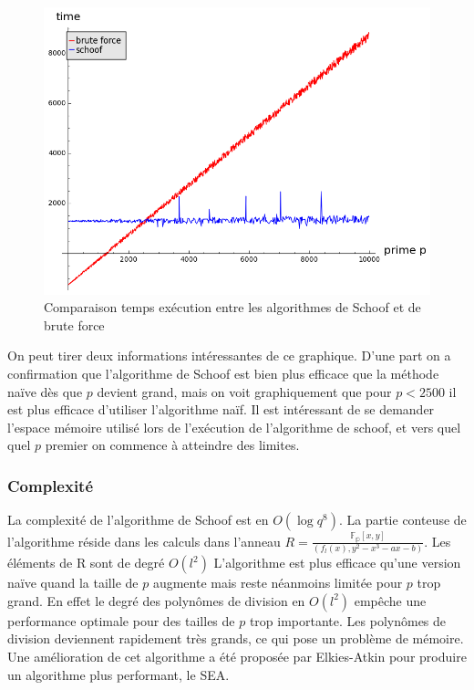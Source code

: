 \documentclass{article}
\begin{document}
\begin{figure}[h!]
\caption{Comparaison temps exécution entre les algorithmes de Schoof et de brute force}
\includegraphics[scale=0.6]{pictures/schoof_vs_bruteforce.png} 
\end{figure}
On peut tirer deux informations intéressantes de ce graphique. D'une part on a confirmation que l'algorithme de Schoof est bien plus efficace que la méthode naïve dès que $p$ devient grand, mais on voit graphiquement que pour $p<2500$ il est plus efficace d'utiliser l'algorithme naïf.
\newline
Il est intéressant de se demander l'espace mémoire utilisé lors de l’exécution de l'algorithme de schoof, et vers quel quel $p$ premier on commence à atteindre des limites.
\newpage
\subsubsection{Complexité}
La complexité de l'algorithme de Schoof est en $O(\log{q}^8)$. La partie conteuse de l'algorithme réside dans les calculs dans l'anneau $R = \frac{\mathbb{F_p}[x,y]}{(f_l(x), y^2 -x^3 -ax -b)}$. Les éléments de R sont de degré $O(l^2)$ 
\newline
 L'algorithme est plus efficace qu'une version naïve quand la taille de $p$ augmente mais reste néanmoins limitée pour $p$ trop grand. En effet le degré des polynômes de division en $O(l^2)$ empêche une performance optimale pour des tailles de $p$ trop importante. Les polynômes de division deviennent rapidement très grands, ce qui pose un problème de mémoire. Une amélioration de cet algorithme a été proposée par Elkies-Atkin pour produire un algorithme plus performant, le SEA. 
 
\end{document}
